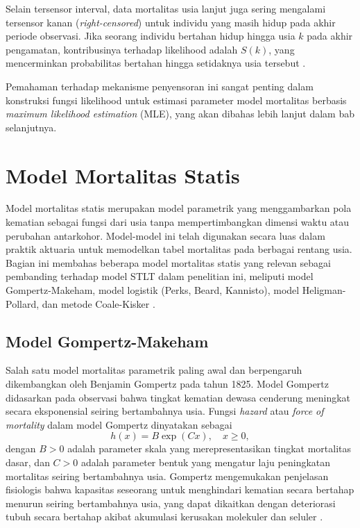 Selain tersensor interval, data mortalitas usia lanjut juga sering mengalami tersensor kanan (\textit{right-censored}) untuk individu yang masih hidup pada akhir periode observasi. Jika seorang individu bertahan hidup hingga usia $k$ pada akhir pengamatan, kontribusinya terhadap likelihood adalah $S(k)$, yang mencerminkan probabilitas bertahan hingga setidaknya usia tersebut \citep{huang2020modelling}.

Pemahaman terhadap mekanisme penyensoran ini sangat penting dalam konstruksi fungsi likelihood untuk estimasi parameter model mortalitas berbasis \textit{maximum likelihood estimation} (MLE), yang akan dibahas lebih lanjut dalam bab selanjutnya.

\section{Model Mortalitas Statis}

Model mortalitas statis merupakan model parametrik yang menggambarkan pola kematian sebagai fungsi dari usia tanpa mempertimbangkan dimensi waktu atau perubahan antarkohor. Model-model ini telah digunakan secara luas dalam praktik aktuaria untuk memodelkan tabel mortalitas pada berbagai rentang usia. Bagian ini membahas beberapa model mortalitas statis yang relevan sebagai pembanding terhadap model STLT dalam penelitian ini, meliputi model Gompertz-Makeham, model logistik (Perks, Beard, Kannisto), model Heligman-Pollard, dan metode Coale-Kisker \citep{huang2020modelling, dickson2020actuarial}.

\subsection{Model Gompertz-Makeham}

Salah satu model mortalitas parametrik paling awal dan berpengaruh dikembangkan oleh Benjamin Gompertz pada tahun 1825. Model Gompertz didasarkan pada observasi bahwa tingkat kematian dewasa cenderung meningkat secara eksponensial seiring bertambahnya usia. Fungsi \textit{hazard} atau \textit{force of mortality} dalam model Gompertz dinyatakan sebagai
\begin{equation}
    h(x) = B \exp(Cx), \quad x \geq 0,
\end{equation}
dengan $B > 0$ adalah parameter skala yang merepresentasikan tingkat mortalitas dasar, dan $C > 0$ adalah parameter bentuk yang mengatur laju peningkatan mortalitas seiring bertambahnya usia. Gompertz mengemukakan penjelasan fisiologis bahwa kapasitas seseorang untuk menghindari kematian secara bertahap menurun seiring bertambahnya usia, yang dapat dikaitkan dengan deteriorasi tubuh secara bertahap akibat akumulasi kerusakan molekuler dan seluler \citep{gompertz1825nature, thatcher1998force}.

